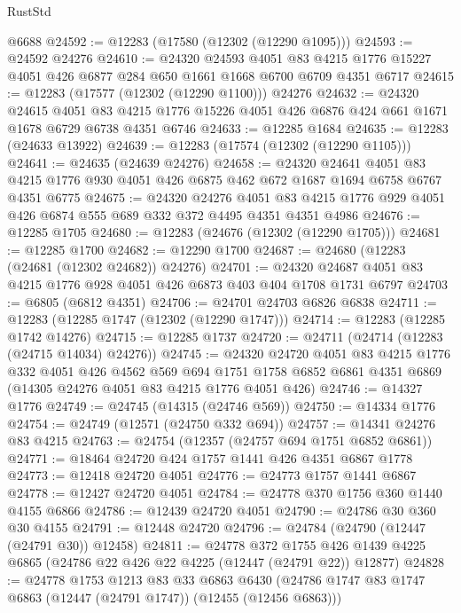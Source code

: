 \begin{lexlean}{RustStd}
\begin{coremodule}
    @6688
@24592 := @12283 (@17580 (@12302 (@12290 @1095)))
@24593 := @24592 @24276
@24610 := @24320
    @24593
    @4051
    @83
    @4215
    @1776
    @15227
    @4051
    @426
    @6877
    @284
    @650
    @1661
    @1668
    @6700
    @6709
    @4351
    @6717
@24615 := @12283 (@17577 (@12302 (@12290 @1100))) @24276
@24632 := @24320
    @24615
    @4051
    @83
    @4215
    @1776
    @15226
    @4051
    @426
    @6876
    @424
    @661
    @1671
    @1678
    @6729
    @6738
    @4351
    @6746
@24633 := @12285 @1684
@24635 := @12283 (@24633 @13922)
@24639 := @12283 (@17574 (@12302 (@12290 @1105)))
@24641 := @24635 (@24639 @24276)
@24658 := @24320
    @24641
    @4051
    @83
    @4215
    @1776
    @930
    @4051
    @426
    @6875
    @462
    @672
    @1687
    @1694
    @6758
    @6767
    @4351
    @6775
@24675 := @24320
    @24276
    @4051
    @83
    @4215
    @1776
    @929
    @4051
    @426
    @6874
    @555
    @689
    @332
    @372
    @4495
    @4351
    @4351
    @4986
@24676 := @12285 @1705
@24680 := @12283 (@24676 (@12302 (@12290 @1705)))
@24681 := @12285 @1700
@24682 := @12290 @1700
@24687 := @24680 (@12283 (@24681 (@12302 @24682)) @24276)
@24701 := @24320 @24687 @4051 @83 @4215 @1776 @928 @4051 @426 @6873 @403 @404 @1708 @1731 @6797
@24703 := @6805 (@6812 @4351)
@24706 := @24701 @24703 @6826 @6838
@24711 := @12283 (@12285 @1747 (@12302 (@12290 @1747)))
@24714 := @12283 (@12285 @1742 @14276)
@24715 := @12285 @1737
@24720 := @24711 (@24714 (@12283 (@24715 @14034) @24276))
@24745 := @24320
    @24720
    @4051
    @83
    @4215
    @1776
    @332
    @4051
    @426
    @4562
    @569
    @694
    @1751
    @1758
    @6852
    @6861
    @4351
    @6869
    (@14305 @24276 @4051 @83 @4215 @1776 @4051 @426)
@24746 := @14327 @1776
@24749 := @24745 (@14315 (@24746 @569))
@24750 := @14334 @1776
@24754 := @24749 (@12571 (@24750 @332 @694))
@24757 := @14341 @24276 @83 @4215
@24763 := @24754 (@12357 (@24757 @694 @1751 @6852 @6861))
@24771 := @18464 @24720 @424 @1757 @1441 @426 @4351 @6867 @1778
@24773 := @12418 @24720 @4051
@24776 := @24773 @1757 @1441 @6867
@24778 := @12427 @24720 @4051
@24784 := @24778 @370 @1756 @360 @1440 @4155 @6866
@24786 := @12439 @24720 @4051
@24790 := @24786 @30 @360 @30 @4155
@24791 := @12448 @24720
@24796 := @24784 (@24790 (@12447 (@24791 @30)) @12458)
@24811 := @24778
    @372
    @1755
    @426
    @1439
    @4225
    @6865
    (@24786 @22 @426 @22 @4225 (@12447 (@24791 @22)) @12877)
@24828 := @24778
    @1753
    @1213
    @83
    @33
    @6863
    @6430
    (@24786 @1747 @83 @1747 @6863 (@12447 (@24791 @1747)) (@12455 (@12456 @6863)))

\end{coremodule}
\end{lexlean}
